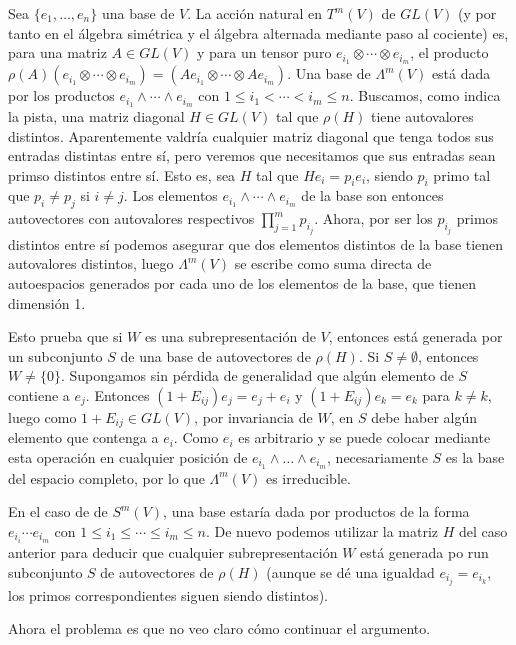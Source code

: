 \documentclass[twoside]{article}
\begin{document}
\begin{solucion}
Sea $\{e_1,\dots, e_n\}$ una base de $V$. La acción natural en $T^m(V)$ de $GL(V)$ (y por tanto en el álgebra simétrica y el álgebra alternada mediante paso al cociente) es, para una matriz $A\in GL(V)$ y para un tensor puro $e_{i_1}\otimes\cdots\otimes e_{i_m}$, el producto $\rho(A)(e_{i_1}\otimes\cdots\otimes e_{i_m})=(Ae_{i_1}\otimes\cdots\otimes Ae_{i_m})$. Una base de $\Lambda^m(V)$ está dada por los productos $e_{i_1}\land\cdots\land e_{i_m}$ con $1\leq i_1<\cdots< i_m\leq n$. Buscamos, como indica la pista, una matriz diagonal $H\in GL(V)$ tal que $\rho(H)$ tiene autovalores distintos. Aparentemente valdría cualquier matriz diagonal que tenga todos sus entradas distintas entre sí, pero veremos que necesitamos que sus entradas sean primso distintos entre sí. Esto es, sea $H$ tal que $He_i=p_ie_i$, siendo $p_i$ primo tal que $p_i\neq p_j$ si $i\neq j$. Los elementos $e_{i_1}\land\cdots\land e_{i_m}$ de la base son entonces autovectores con autovalores respectivos $\prod_{j=1}^m p_{i_j}$. Ahora, por ser los $p_{i_j}$ primos distintos entre sí podemos asegurar que dos elementos distintos de la base tienen autovalores distintos, luego $\Lambda^m(V)$ se escribe como suma directa de autoespacios generados por cada uno de los elementos de la base, que tienen dimensión 1. 

Esto prueba que si $W$ es una subrepresentación de $V$, entonces está generada por un subconjunto $S$ de una base de autovectores de $\rho(H)$. Si $S\neq\emptyset$, entonces $W\neq \{0\}$. Supongamos sin pérdida de generalidad que algún elemento de $S$ contiene a $e_j$. Entonces $(1+E_{ij})e_j=e_j+e_i$ y $(	1+E_{ij})e_k=e_k$ para $k\neq k$, luego como $1+E_{ij}\in GL(V)$, por invariancia de $W$, en $S$ debe haber algún elemento que contenga a $e_i$. Como $e_i$ es arbitrario y se puede colocar mediante esta operación en cualquier posición de $e_{i_1}\land\dots\land e_{i_m}$, necesariamente $S$ es la base del espacio completo, por lo que $\Lambda^m(V)$ es irreducible. 

En el caso de de $S^m(V)$, una base estaría dada por productos de la forma $e_{i_i}\cdots e_{i_m}$ con $1\leq i_1\leq\cdots\leq i_m\leq n$. De nuevo podemos utilizar la matriz $H$ del caso anterior para deducir que cualquier subrepresentación $W$ está generada po run subconjunto $S$ de autovectores de $\rho(H)$ (aunque se dé una igualdad $e_{i_j}=e_{i_k}$, los primos correspondientes siguen siendo distintos). 

Ahora el problema es que no veo claro cómo continuar el argumento.
\end{solucion}
\end{document}
